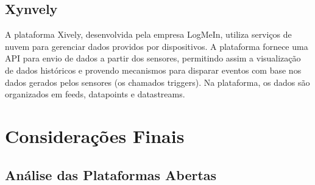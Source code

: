 \subsection{Xynvely}

A plataforma Xively\cite{Xively:iot}, desenvolvida pela empresa LogMeIn,
utiliza serviços de nuvem para gerenciar dados providos por dispositivos.
A plataforma fornece uma API para envio de dados a partir dos sensores,
permitindo assim a visualização de dados históricos e provendo mecanismos
para disparar eventos com base nos dados gerados pelos sensores (os
chamados triggers). Na plataforma, os dados são organizados em feeds,
datapoints e datastreams.

\section{Considerações Finais}

\subsection{Análise das Plataformas Abertas}

